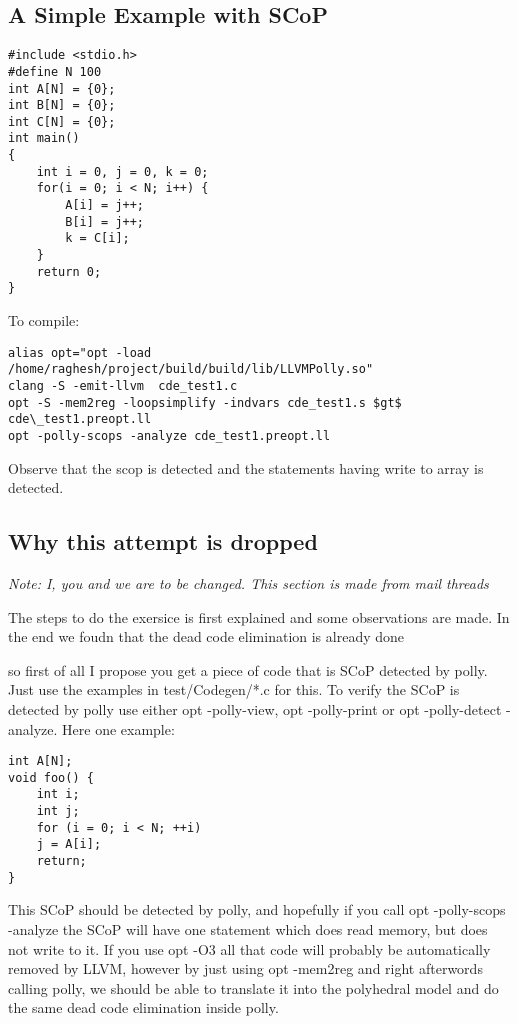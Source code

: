\documentclass[a4paper,10pt]{article}
\begin{document}
\subsection{A Simple Example with SCoP}
 
\begin{verbatim}
#include <stdio.h>
#define N 100
int A[N] = {0};
int B[N] = {0};
int C[N] = {0};
int main()
{
    int i = 0, j = 0, k = 0;
    for(i = 0; i < N; i++) {
        A[i] = j++;
        B[i] = j++;
        k = C[i];
    }
    return 0;
}
\end{verbatim}
To compile:
\begin{verbatim}
alias opt="opt -load /home/raghesh/project/build/build/lib/LLVMPolly.so"
clang -S -emit-llvm  cde_test1.c
opt -S -mem2reg -loopsimplify -indvars cde_test1.s $gt$ cde\_test1.preopt.ll
opt -polly-scops -analyze cde_test1.preopt.ll
\end{verbatim}
Observe that the scop is detected and the statements having write to array is detected.

\subsection{Why this attempt is dropped}
\emph{Note: I, you and we are to be changed. This section is made from mail threads}

The steps to do the exersice is first explained and some observations are made. In the end we foudn that the dead code elimination is already done

so first of all I propose you get a piece of code that is SCoP detected by polly. Just use the examples in test/Codegen/*.c for this.
                                                                                                                                                                       To verify the SCoP is detected by polly use either opt -polly-view, opt -polly-print or opt -polly-detect -analyze.
Here one example:

\begin{verbatim}
int A[N];
void foo() {
    int i;
    int j;
    for (i = 0; i < N; ++i)
    j = A[i];
    return;
}
\end{verbatim}

This SCoP should be detected by polly, and hopefully if you call opt -polly-scops -analyze the SCoP will have one statement which does read memory, but does not write to it. If you use opt -O3 all that code will probably be automatically removed by LLVM, however by just using opt -mem2reg and right afterwords calling polly, we should be able to translate it into the polyhedral model and do the same dead code elimination inside polly.
\end{document}

